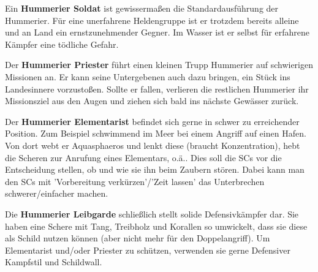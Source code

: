 Ein \textbf{Hummerier Soldat} ist gewissermaßen die Standardausführung der Hummerier. Für eine unerfahrene Heldengruppe ist er trotzdem bereits alleine und an Land ein ernstzunehmender Gegner. Im Wasser ist er selbst für erfahrene Kämpfer eine tödliche Gefahr. 

Der \textbf{Hummerier Priester} führt einen kleinen Trupp Hummerier auf schwierigen Missionen an. Er kann seine Untergebenen auch dazu bringen, ein Stück ins Landesinnere vorzustoßen. Sollte er fallen, verlieren die restlichen Hummerier ihr Missionsziel aus den Augen und ziehen sich bald ins nächste Gewässer zurück. 

Der \textbf{Hummerier Elementarist} befindet sich gerne in schwer zu erreichender Position. Zum Beispiel schwimmend im Meer bei einem Angriff auf einen Hafen. Von dort webt er Aquasphaeros und lenkt diese (braucht Konzentration), hebt die Scheren zur Anrufung eines Elementars, o.ä.. Dies soll die SCs vor die Entscheidung stellen, ob und wie sie ihn beim Zaubern stören. Dabei kann man den SCs mit 'Vorbereitung verkürzen'/'Zeit lassen' das Unterbrechen schwerer/einfacher machen. 

Die \textbf{Hummerier Leibgarde} schließlich stellt solide Defensivkämpfer dar. Sie haben eine Schere mit Tang, Treibholz und Korallen so umwickelt, dass sie diese als Schild nutzen können (aber nicht mehr für den Doppelangriff). Um Elementarist und/oder Priester zu schützen, verwenden sie gerne Defensiver Kampfstil und Schildwall.



\kreaturhummeriersoldat
\kreaturhummerierleibgarde
\kreaturhummerierelementarist
\kreaturhummerierpriesterkrustentiere
\spaltenende